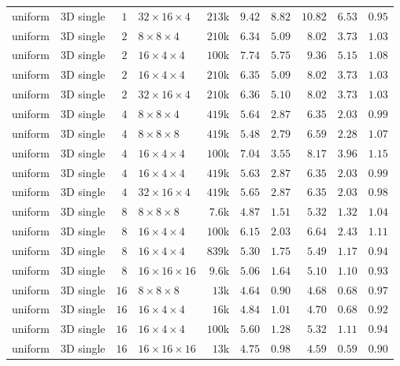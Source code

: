 {\begin{longtable}{llrlrrrrrr}
    uniform & 3D single & $1$ & $32{\times}16{\times}4$ & $213$k & $9.42$ & $8.82$ & $10.82$ & $6.53$ & $0.95$ \\
    uniform & 3D single & $2$ & $8{\times}8{\times}4$ & $210$k & $6.34$ & $5.09$ & $8.02$ & $3.73$ & $1.03$ \\
    uniform & 3D single & $2$ & $16{\times}4{\times}4$ & $100$k & $7.74$ & $5.75$ & $9.36$ & $5.15$ & $1.08$ \\
    uniform & 3D single & $2$ & $16{\times}4{\times}4$ & $210$k & $6.35$ & $5.09$ & $8.02$ & $3.73$ & $1.03$ \\
    uniform & 3D single & $2$ & $32{\times}16{\times}4$ & $210$k & $6.36$ & $5.10$ & $8.02$ & $3.73$ & $1.03$ \\
    uniform & 3D single & $4$ & $8{\times}8{\times}4$ & $419$k & $5.64$ & $2.87$ & $6.35$ & $2.03$ & $0.99$ \\
    uniform & 3D single & $4$ & $8{\times}8{\times}8$ & $419$k & $5.48$ & $2.79$ & $6.59$ & $2.28$ & $1.07$ \\
    uniform & 3D single & $4$ & $16{\times}4{\times}4$ & $100$k & $7.04$ & $3.55$ & $8.17$ & $3.96$ & $1.15$ \\
    uniform & 3D single & $4$ & $16{\times}4{\times}4$ & $419$k & $5.63$ & $2.87$ & $6.35$ & $2.03$ & $0.99$ \\
    uniform & 3D single & $4$ & $32{\times}16{\times}4$ & $419$k & $5.65$ & $2.87$ & $6.35$ & $2.03$ & $0.98$ \\
    uniform & 3D single & $8$ & $8{\times}8{\times}8$ & $7.6$k & $4.87$ & $1.51$ & $5.32$ & $1.32$ & $1.04$ \\
    uniform & 3D single & $8$ & $16{\times}4{\times}4$ & $100$k & $6.15$ & $2.03$ & $6.64$ & $2.43$ & $1.11$ \\
    uniform & 3D single & $8$ & $16{\times}4{\times}4$ & $839$k & $5.30$ & $1.75$ & $5.49$ & $1.17$ & $0.94$ \\
    uniform & 3D single & $8$ & $16{\times}16{\times}16$ & $9.6$k & $5.06$ & $1.64$ & $5.10$ & $1.10$ & $0.93$ \\
    uniform & 3D single & $16$ & $8{\times}8{\times}8$ & $13$k & $4.64$ & $0.90$ & $4.68$ & $0.68$ & $0.97$ \\
    uniform & 3D single & $16$ & $16{\times}4{\times}4$ & $16$k & $4.84$ & $1.01$ & $4.70$ & $0.68$ & $0.92$ \\
    uniform & 3D single & $16$ & $16{\times}4{\times}4$ & $100$k & $5.60$ & $1.28$ & $5.32$ & $1.11$ & $0.94$ \\
    uniform & 3D single & $16$ & $16{\times}16{\times}16$ & $13$k & $4.75$ & $0.98$ & $4.59$ & $0.59$ & $0.90$ \\

\end{longtable}}
